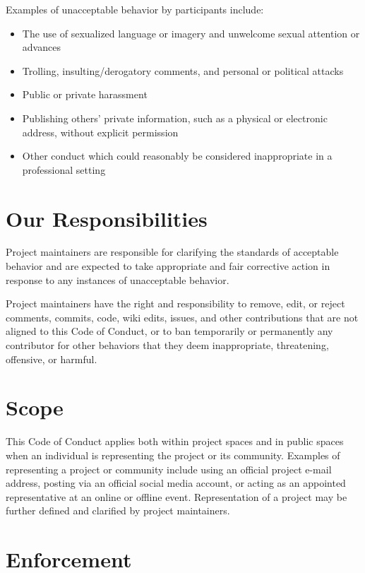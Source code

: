 \documentclass[
  letterpaper,
  oneside,
  open=any]{scrbook}
\providecommand{\tightlist}{%
  \setlength{\itemsep}{0pt}\setlength{\parskip}{0pt}}\usepackage{longtable,booktabs,array}
\begin{document}
Examples of unacceptable behavior by participants include:

\begin{itemize}
\tightlist
\item
  The use of sexualized language or imagery and unwelcome sexual
  attention or advances
\item
  Trolling, insulting/derogatory comments, and personal or political
  attacks
\item
  Public or private harassment
\item
  Publishing others' private information, such as a physical or
  electronic address, without explicit permission
\item
  Other conduct which could reasonably be considered inappropriate in a
  professional setting
\end{itemize}

\hypertarget{our-responsibilities}{%
\section{Our Responsibilities}\label{our-responsibilities}}

Project maintainers are responsible for clarifying the standards of
acceptable behavior and are expected to take appropriate and fair
corrective action in response to any instances of unacceptable behavior.

Project maintainers have the right and responsibility to remove, edit,
or reject comments, commits, code, wiki edits, issues, and other
contributions that are not aligned to this Code of Conduct, or to ban
temporarily or permanently any contributor for other behaviors that they
deem inappropriate, threatening, offensive, or harmful.

\hypertarget{scope}{%
\section{Scope}\label{scope}}

This Code of Conduct applies both within project spaces and in public
spaces when an individual is representing the project or its community.
Examples of representing a project or community include using an
official project e-mail address, posting via an official social media
account, or acting as an appointed representative at an online or
offline event. Representation of a project may be further defined and
clarified by project maintainers.

\hypertarget{enforcement}{%
\section{Enforcement}\label{enforcement}}
\end{document}
